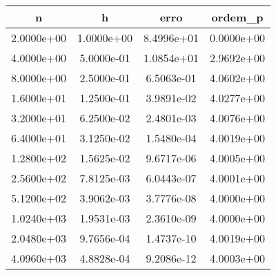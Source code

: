 \begin{table}[htb]
    \centering
    \begin{tabular}{@{}cccc@{}}
        \toprule
        n & h & erro & ordem\_p \\ \hline
        \midrule
        2.0000e+00 & 1.0000e+00 & 8.4996e+01 & 0.0000e+00 \\ \hline
        4.0000e+00 & 5.0000e-01 & 1.0854e+01 & 2.9692e+00 \\ \hline
        8.0000e+00 & 2.5000e-01 & 6.5063e-01 & 4.0602e+00 \\ \hline
        1.6000e+01 & 1.2500e-01 & 3.9891e-02 & 4.0277e+00 \\ \hline
        3.2000e+01 & 6.2500e-02 & 2.4801e-03 & 4.0076e+00 \\ \hline
        6.4000e+01 & 3.1250e-02 & 1.5480e-04 & 4.0019e+00 \\ \hline
        1.2800e+02 & 1.5625e-02 & 9.6717e-06 & 4.0005e+00 \\ \hline
        2.5600e+02 & 7.8125e-03 & 6.0443e-07 & 4.0001e+00 \\ \hline
        5.1200e+02 & 3.9062e-03 & 3.7776e-08 & 4.0000e+00 \\ \hline
        1.0240e+03 & 1.9531e-03 & 2.3610e-09 & 4.0000e+00 \\ \hline
        2.0480e+03 & 9.7656e-04 & 1.4737e-10 & 4.0019e+00 \\ \hline
        4.0960e+03 & 4.8828e-04 & 9.2086e-12 & 4.0003e+00 \\ \hline
        \bottomrule
    \end{tabular}
\end{table}
